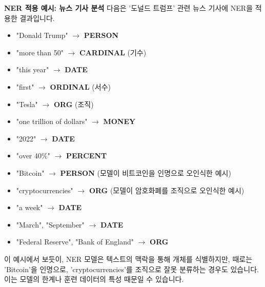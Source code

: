 \documentclass[11pt,a4paper]{article}
\begin{document}
\begin{examplebox}
\textbf{NER 적용 예시: 뉴스 기사 분석}
다음은 '도널드 트럼프' 관련 뉴스 기사에 NER을 적용한 결과입니다.
\begin{itemize}
    \item "Donald Trump" $\rightarrow$ \textbf{PERSON}
    \item "more than 50" $\rightarrow$ \textbf{CARDINAL} (기수)
    \item "this year" $\rightarrow$ \textbf{DATE}
    \item "first" $\rightarrow$ \textbf{ORDINAL} (서수)
    \item "Tesla" $\rightarrow$ \textbf{ORG} (조직)
    \item "one trillion of dollars" $\rightarrow$ \textbf{MONEY}
    \item "2022" $\rightarrow$ \textbf{DATE}
    \item "over 40\%" $\rightarrow$ \textbf{PERCENT}
    \item "Bitcoin" $\rightarrow$ \textbf{PERSON} (모델이 비트코인을 인명으로 오인식한 예시)
    \item "cryptocurrencies" $\rightarrow$ \textbf{ORG} (모델이 암호화폐를 조직으로 오인식한 예시)
    \item "a week" $\rightarrow$ \textbf{DATE}
    \item "March", "September" $\rightarrow$ \textbf{DATE}
    \item "Federal Reserve", "Bank of England" $\rightarrow$ \textbf{ORG}
\end{itemize}
이 예시에서 보듯이, NER 모델은 텍스트의 맥락을 통해 개체를 식별하지만, 때로는 'Bitcoin'을 인명으로, 'cryptocurrencies'를 조직으로 잘못 분류하는 경우도 있습니다. 이는 모델의 한계나 훈련 데이터의 특성 때문일 수 있습니다.
\end{examplebox}
\end{document}
